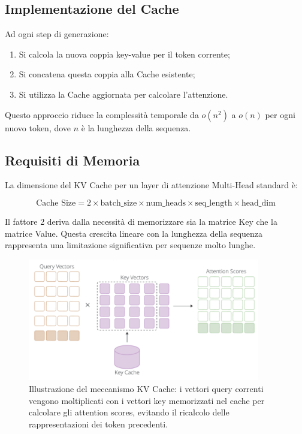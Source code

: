\subsection{Implementazione del Cache}
Ad ogni step di generazione:
\begin{enumerate}
    \item Si calcola la nuova coppia key-value per il token corrente;
    \item Si concatena questa coppia alla Cache esistente;
    \item Si utilizza la Cache aggiornata per calcolare l'attenzione.
\end{enumerate}

Questo approccio riduce la complessità temporale da $o(n^2)$ a $o(n)$ per ogni nuovo token, dove $n$ è la lunghezza della sequenza.

\subsection{Requisiti di Memoria}
La dimensione del KV Cache per un layer di attenzione Multi-Head standard è:

\[
    \text{Cache Size} = 2 \times \text{batch\_size} \times \text{num\_heads} \times \text{seq\_length} \times \text{head\_dim}
\]

Il fattore 2 deriva dalla necessità di memorizzare sia la matrice Key che la matrice Value. Questa crescita lineare con la lunghezza della sequenza rappresenta una limitazione significativa per sequenze molto lunghe.

\begin{figure}
    \centering
    \includegraphics[width=0.9\textwidth]{figure/KVCache}
    \caption{Illustrazione del meccanismo KV Cache: i vettori query correnti vengono moltiplicati con i vettori key memorizzati nel cache per calcolare gli attention scores, evitando il ricalcolo delle rappresentazioni dei token precedenti.}
    \label{fig:KVC}
\end{figure}
